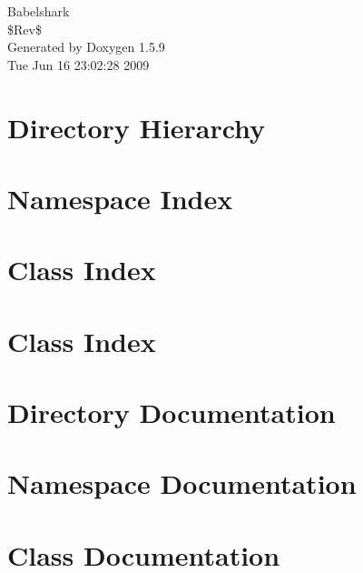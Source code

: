 \documentclass[a4paper]{book}
\begin{document}
\hypersetup{pageanchor=false}
\begin{titlepage}
\vspace*{7cm}
\begin{center}
{\Large Babelshark \\[1ex]\large \$Rev\$ }\\
\vspace*{1cm}
{\large Generated by Doxygen 1.5.9}\\
\vspace*{0.5cm}
{\small Tue Jun 16 23:02:28 2009}\\
\end{center}
\end{titlepage}
\clearemptydoublepage
{}
\tableofcontents
\clearemptydoublepage
{}
\hypersetup{pageanchor=true}
\chapter{Directory Hierarchy}

\chapter{Namespace Index}

\chapter{Class Index}

\chapter{Class Index}

\chapter{Directory Documentation}









\chapter{Namespace Documentation}

\chapter{Class Documentation}

\printindex
\end{document}
